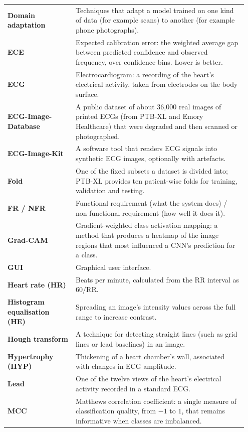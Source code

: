 \begin{longtable}{@{}>{\raggedright\arraybackslash}p{0.27\linewidth} p{0.68\linewidth}@{}}
  \textbf{Domain adaptation} & Techniques that adapt a model trained on one kind of data (for example scans) to another (for example phone photographs). \\
  \textbf{ECE} & Expected calibration error: the weighted average gap between predicted confidence and observed frequency, over confidence bins. Lower is better. \\
  \textbf{ECG} & Electrocardiogram: a recording of the heart's electrical activity, taken from electrodes on the body surface. \\
  \textbf{ECG-Image-Database} & A public dataset of about 36,000 real images of printed ECGs (from PTB-XL and Emory Healthcare) that were degraded and then scanned or photographed. \\
  \textbf{ECG-Image-Kit} & A software tool that renders ECG signals into synthetic ECG images, optionally with artefacts. \\
  \textbf{Fold} & One of the fixed subsets a dataset is divided into; PTB-XL provides ten patient-wise folds for training, validation and testing. \\
  \textbf{FR / NFR} & Functional requirement (what the system does) / non-functional requirement (how well it does it). \\
  \textbf{Grad-CAM} & Gradient-weighted class activation mapping: a method that produces a heatmap of the image regions that most influenced a CNN's prediction for a class. \\
  \textbf{GUI} & Graphical user interface. \\
  \textbf{Heart rate (HR)} & Beats per minute, calculated from the RR interval as $60/\mathrm{RR}$. \\
  \textbf{Histogram equalisation (HE)} & Spreading an image's intensity values across the full range to increase contrast. \\
  \textbf{Hough transform} & A technique for detecting straight lines (such as grid lines or lead baselines) in an image. \\
  \textbf{Hypertrophy (HYP)} & Thickening of a heart chamber's wall, associated with changes in ECG amplitude. \\
  \textbf{Lead} & One of the twelve views of the heart's electrical activity recorded in a standard ECG. \\
  \textbf{MCC} & Matthews correlation coefficient: a single measure of classification quality, from $-1$ to $1$, that remains informative when classes are imbalanced. \\

\end{longtable}
